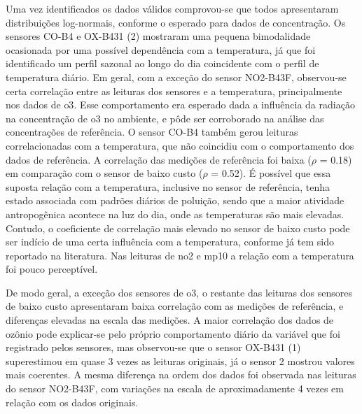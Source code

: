 Uma vez identificados os dados válidos comprovou-se que todos apresentaram distribuições log-normais, conforme o esperado para dados de concentração. Os sensores CO-B4 e OX-B431 (2) mostraram uma pequena bimodalidade ocasionada por uma possível dependência com a temperatura, já que foi identificado um perfil sazonal ao longo do dia coincidente com o perfil de temperatura diário. Em geral, com a exceção do sensor NO2-B43F, observou-se certa correlação entre as leituras dos sensores e a temperatura, principalmente nos dados de \acrshort{o3}. Esse comportamento era esperado dada a influência da radiação na concentração de \acrshort{o3} no ambiente, e pôde ser corroborado na análise das concentrações de referência. O sensor CO-B4 também gerou leituras correlacionadas com a temperatura, que não coincidiu com o comportamento dos dados de referência. A correlação das medições de referência foi baixa ($\rho$ = 0.18) em comparação com o sensor de baixo custo ($\rho$ = 0.52). É possível que essa suposta relação com a temperatura, inclusive no sensor de referência, tenha estado associada com padrões diários de poluição, sendo que a maior atividade antropogênica acontece na luz do dia, onde as temperaturas são mais elevadas. Contudo, o coeficiente de correlação mais elevado no sensor de baixo custo pode ser indício de uma certa influência com a temperatura, conforme já tem sido reportado na literatura. Nas leituras de \acrshort{no2} e \acrshort{mp10} a relação com a temperatura foi pouco perceptível.

De modo geral, a exceção dos sensores de \acrshort{o3}, o restante das leituras dos sensores de baixo custo apresentaram baixa correlação com as medições de referência, e diferenças elevadas na escala das medições. A maior correlação dos dados de ozônio pode explicar-se pelo próprio comportamento diário da variável que foi registrado pelos sensores, mas observou-se que o sensor OX-B431 (1) superestimou em quase 3 vezes as leituras originais, já o sensor 2 mostrou valores mais coerentes. A mesma diferença na ordem dos dados foi observada nas leituras do sensor NO2-B43F, com variações na escala de aproximadamente 4 vezes em relação com os dados originais.